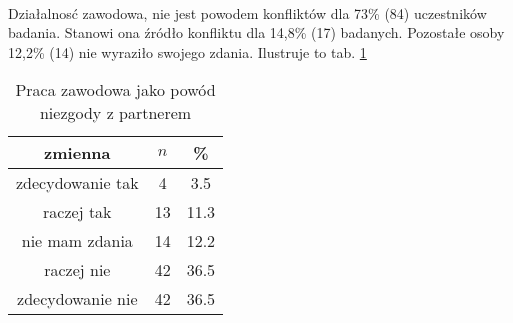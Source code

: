 
\

Działalnosć zawodowa, nie jest powodem konfliktów dla 73\% (84) uczestników badania. Stanowi ona źródło konfliktu dla 14,8\% (17) badanych. Pozostałe osoby 12,2\% (14) nie wyraziło swojego zdania. Ilustruje to tab. \ref{tab:Q28}


\begin{table}[H]
\caption{Praca zawodowa jako powód niezgody z partnerem}
\centering
\begin{tabular}{ | c | c | c |}
\hline
zmienna & $n$ & \% \\
\hline
zdecydowanie tak  &  4  & 3.5 \\
\hline
raczej tak  &  13  & 11.3 \\
\hline
nie mam zdania  &  14  & 12.2 \\
\hline
raczej nie  &  42  & 36.5 \\
\hline
zdecydowanie nie  &  42  & 36.5\\
\hline
\end{tabular}
\label{tab:Q28}
\end{table}
